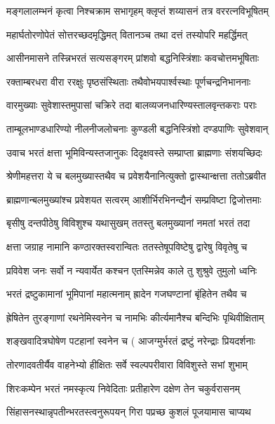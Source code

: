 \twolineshloka
{मङ्गलालम्भनं कृत्वा निश्चक्राम सभागृहम्}
{क्लृप्तं शय्यासनं तत्र वररत्नविभूषितम्}%

\twolineshloka
{महार्घतोरणोपेतं सोत्तरच्छदमृद्धिमत्}
{वितानञ्च तथा दत्तं तस्योपरि महर्द्धिमत्}%

\twolineshloka
{आसीनमासने तस्न्निभरतं सत्यसङ्गरम्}
{प्रांशवो बद्धनिस्त्रिंशाः कवचोत्तमभूषिताः}%

\twolineshloka
{रक्ताम्बरधरा वीरा ररक्षुः पृष्ठसंस्थिताः}
{तथैवोभयपार्श्वस्थाः पूर्णचन्द्रनिभाननाः}%

\twolineshloka
{वारमुख्याः सुवेशास्तमुपासां चक्रिरे तदा}
{बालव्यजनधारिण्यस्तालवृन्तकराः पराः}%

\twolineshloka
{ताम्बूलभाण्डधारिण्यो नीलनीजलोचनाः}
{कुण्डली बद्धनिस्त्रिंशो दण्डपाणिः सुवेशवान्} %

\twolineshloka
{उवाच भरतं क्षत्ता भूमिविन्यस्तजानुकः}
{दिदृक्षवस्ते सम्प्राप्ता ब्राह्मणाः संशयच्छिदः}%

\twolineshloka
{श्रेणीमहत्तरा ये च बलमुख्यास्तथैव च}
{प्रवेशयैनानित्युक्तो द्वास्थान्क्षत्ता ततोऽब्रवीत}%

\twolineshloka
{ब्राह्मणान्बलमुख्यांश्च प्रवेशयत सत्वरम्}
{आशीर्भिरभिनन्द्यैनं सम्प्रविष्टा द्विजोत्तमाः}%

\twolineshloka
{बृसीषु दन्तपीठेषु विविशुश्च यथासुखम्}
{ततस्तु बलमुख्यानां नमतां भरतं तदा}%

\twolineshloka
{क्षत्ता जग्राह नामानि कण्ठारक्तस्वरान्वितः}
{ततस्तेषूपविष्टेषु द्वारेषु विवृतेषु च}%

\twolineshloka
{प्रविवेश जनः सर्वो न न्यवार्येत कश्चन}
{एतस्मिन्नेव काले तु शुश्रुवे तुमुलो ध्वनिः}%

\twolineshloka
{भरतं द्रष्टुकामानां भूमिपानां महात्मनाम्}
{ह्रादेन गजघण्टानां बृंहितेन तथैव च}%

\twolineshloka
{ह्रेषितेन तुरङ्गाणां रथनेमिस्वनेन च}
{नामभिः कीर्त्यमानैश्च बन्दिभिः पृथिवीक्षिताम्}%

\twolineshloka
{शङ्खवादित्रघोषेण पटहानां स्वनेन च}
{( आजग्मुर्भरतं द्रष्टुं नरेन्द्राः प्रियदर्शनाः}%

\twolineshloka
{तोरणादवतीर्यैव वाहनेभ्यो हीक्षितः}
{सर्वे स्वल्पपरीवारा विविशुस्ते सभां शुभाम्} %

\twolineshloka
{शिरःकम्पेन भरतं नमस्कृत्य निवेदिताः}
{प्रतीहारेण दक्षेण तेन चकुर्वरासनम्}%

\twolineshloka
{सिंहासनस्थान्नृपतीन्भरतस्त्वनुरूपयन्}
{गिरा पप्रच्छ कुशलं पूजयामास चाप्यथ}%

